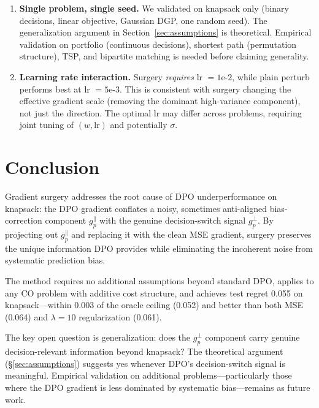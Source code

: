 \documentclass[11pt]{article}
\begin{document}
\begin{enumerate}[itemsep=8pt]
  \item \textbf{Single problem, single seed.}  We validated on knapsack only
        (binary decisions, linear objective, Gaussian DGP, one random seed).
        The generalization argument in Section~\ref{sec:assumptions} is
        theoretical.  Empirical validation on portfolio (continuous decisions),
        shortest path (permutation structure), TSP, and bipartite matching is
        needed before claiming generality.

  \item \textbf{Learning rate interaction.}  Surgery \emph{requires} lr $=
        1\text{e-}2$, while plain perturb performs best at lr $= 5\text{e-}3$.
        This is consistent with surgery changing the effective gradient scale
        (removing the dominant high-variance component), not just the direction.
        The optimal lr may differ across problems, requiring joint tuning of
        $(w, \mathrm{lr})$ and potentially $\sigma$.

\end{enumerate}

\section{Conclusion}

Gradient surgery addresses the root cause of DPO underperformance on knapsack:
the DPO gradient conflates a noisy, sometimes anti-aligned bias-correction
component $g_p^{\parallel}$ with the genuine decision-switch signal $g_p^{\perp}$.
By projecting out $g_p^{\parallel}$ and replacing it with the clean MSE gradient,
surgery preserves the unique information DPO provides while eliminating the
incoherent noise from systematic prediction bias.

The method requires no additional assumptions beyond standard DPO, applies to any
CO problem with additive cost structure, and achieves test regret 0.055 on
knapsack---within 0.003 of the oracle ceiling (0.052) and better than both MSE
(0.064) and $\lambda = 10$ regularization (0.061).

The key open question is generalization: does the $g_p^{\perp}$ component carry
genuine decision-relevant information beyond knapsack?  The theoretical argument
(§\ref{sec:assumptions}) suggests yes whenever DPO's decision-switch signal is
meaningful.  Empirical validation on additional problems---particularly those where
the DPO gradient is less dominated by systematic bias---remains as future work.
\end{document}
